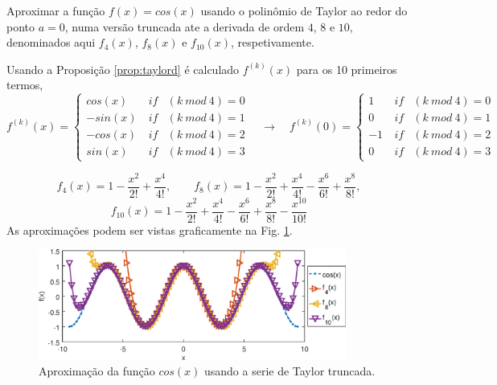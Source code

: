 \begin{example}
Aproximar a função $f(x)=cos(x)$ usando o polinômio de Taylor ao redor do ponto $a=0$,
numa versão truncada ate a derivada de ordem $4$, $8$ e $10$,
denominados aqui $f_4(x)$, $f_8(x)$ e $f_{10}(x)$, respetivamente.
\end{example}
\begin{SolutionT}
Usando a Proposição \ref{prop:taylord} é calculado $f^{(k)}(x)$ para os 10 primeiros termos,
\begin{equation}
f^{(k)}(x)=
\left\{
\begin{matrix}
cos(x) & ~if & (k~mod~4)=0\\
-sin(x)& ~if & (k~mod~4)=1\\
-cos(x)& ~if & (k~mod~4)=2\\
sin(x) & ~if & (k~mod~4)=3
\end{matrix}
\right.
\quad \rightarrow \quad
f^{(k)}(0)=
\left\{
\begin{matrix}
1 & ~if & (k~mod~4)=0\\
0& ~if & (k~mod~4)=1\\
-1& ~if & (k~mod~4)=2\\
0 & ~if & (k~mod~4)=3
\end{matrix}
\right.
\end{equation}

\begin{equation}
f_{4}(x)=
1
-\frac{x^{2}}{2!} 
+\frac{x^{4}}{4!},
\qquad 
f_{8}(x)=
1
-\frac{x^{2}}{2!} 
+\frac{x^{4}}{4!} 
-\frac{x^{6}}{6!} 
+\frac{x^{8}}{8!}, 
\end{equation}
\begin{equation}
f_{10}(x)=
1
-\frac{x^{2}}{2!} 
+\frac{x^{4}}{4!} 
-\frac{x^{6}}{6!} 
+\frac{x^{8}}{8!} 
-\frac{x^{10}}{10!} 
\end{equation}
As aproximações podem ser vistas graficamente na Fig. \ref{fig:taylore}.
\end{SolutionT}

\begin{figure}[!h]
  \centering
    \includegraphics[width=0.90\textwidth]{chapters/funcoes/mcode/taylorR1R1/taylore.eps}
  \caption{Aproximação da função $cos(x)$ usando a serie de Taylor truncada.}
    \label{fig:taylore}
\end{figure}
 
